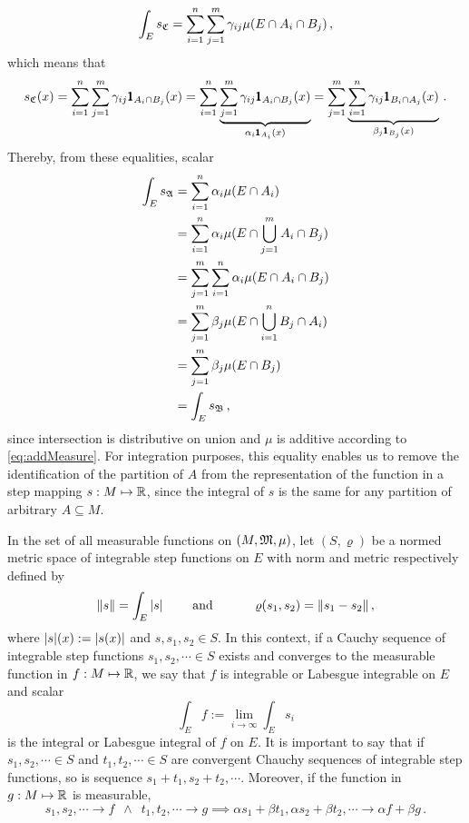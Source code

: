 \begin{equation*}
\int_E s_{\mathfrak{C}} = \sum_{i=1}^n\sum_{j=1}^m\gamma_{ij}\mu(E\cap A_i\cap B_j)\,,
\end{equation*}
which means that
\begin{equation*}
s_{\mathfrak{C}}(x) = \sum_{i=1}^n\sum_{j=1}^m\gamma_{ij}\pmb{1}_{A_i\cap B_j}(x) = \sum_{i=1}^n\underbrace{\sum_{j=1}^m\gamma_{ij}\pmb{1}_{A_i\cap B_j}(x)}_{\alpha_i\pmb{1}_{A_i}(x)}=\sum_{j=1}^m\underbrace{\sum_{i=1}^n\gamma_{ij}\pmb{1}_{B_i\cap A_j}(x)}_{\beta_j\pmb{1}_{B_j}(x)}\,.
\end{equation*}
Thereby, from these equalities, scalar 
\begin{align*}
\int_E s_{\mathfrak{A}} &= \sum_{i=1}^n\alpha_i\mu(E\cap A_i)\\
&= \sum_{i=1}^n\alpha_i\mu(E\cap \bigcup_{j=1}^mA_i\cap B_j)\\
&= \sum_{j=1}^m\sum_{i=1}^n\alpha_i\mu(E\cap A_i\cap B_j)\\
&= \sum_{j=1}^m\beta_j\mu(E\cap \bigcup_{i=1}^nB_j\cap A_i)\\
&= \sum_{j=1}^m\beta_j\mu(E\cap B_j)\\
&=\int_E s_{\mathfrak{B}}\,,
\end{align*}
since intersection is distributive on union and $\mu$ is additive according to \eqref{eq:addMeasure}. For integration purposes, this equality enables us to remove the identification of the partition of $A$ from the representation of the function in a step mapping $s : M \mapsto \mathbb{R}$, since the integral of $s$ is the same for any partition of arbitrary $A\subseteq M$.

In the set of all measurable functions on $(M,\mathfrak{M},\mu)$, let $(S,\varrho)$ be a normed metric space of integrable step functions on $E$ with norm and metric respectively defined by
\begin{alignat*} {3}
\|s\|=\int_E |s|&\qquad \text{ and } \qquad&\varrho(s_1,s_2)=\|s_1-s_2\|\,,
\end{alignat*}
where $|s|(x):=|s(x)|$ and $s,s_1,s_2\in S$. In this context, if a Cauchy sequence of integrable step functions $s_1,s_2,\cdots\in S$ exists and converges to the measurable function in $f : M \mapsto \mathbb{R}$, we say that $f$ is integrable or Labesgue integrable on $E$ and scalar
\begin{equation}\label{eq:integ}
\int_E f := \lim_{i\to \infty}\int_E s_i
\end{equation}
is the integral or Labesgue integral of $f$ on $E$. It is important to say that if $s_1,s_2,\cdots\in S$ and $t_1,t_2,\cdots\in S$ are convergent Chauchy sequences of integrable step functions, so is sequence $ s_1+t_1, s_2+ t_2,\cdots$. Moreover, if the function in $g : M \mapsto \mathbb{R}$ is measurable, 
\begin{equation}\label{eq:cauchySum}
s_1,s_2,\cdots\to f\,\,\, \wedge\,\,\, t_1,t_2,\cdots\to g \implies \alpha s_1+ \beta t_1, \alpha s_2+ \beta t_2,\cdots\to \alpha f+\beta g\,.
\end{equation}

